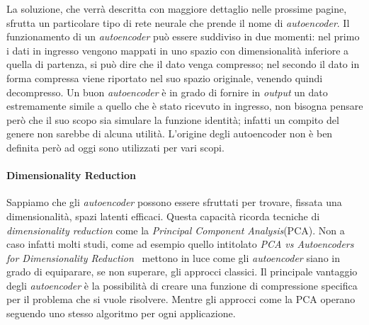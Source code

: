 %
%
%
%

La soluzione, che verrà descritta con maggiore dettaglio nelle prossime pagine, sfrutta un particolare tipo di rete neurale che prende il nome di \textit{autoencoder}.
Il funzionamento di un \textit{autoencoder} può essere suddiviso in due momenti:
nel primo i dati in ingresso vengono mappati in uno spazio con dimensionalità inferiore a quella di partenza, si può dire che il dato venga compresso;
nel secondo il dato in forma compressa viene riportato nel suo spazio originale, venendo quindi decompresso.
Un buon \textit{autoencoder} è in grado di fornire in \textit{output} un dato estremamente simile a quello che è stato ricevuto in ingresso, non bisogna pensare però che il suo scopo sia simulare la funzione identità; infatti un compito del genere non sarebbe di alcuna utilità.
L'origine degli autoencoder non è ben definita però ad oggi sono utilizzati per vari scopi.


\paragraph{Dimensionality Reduction}
Sappiamo che gli \textit{autoencoder} possono essere sfruttati per trovare, fissata una dimensionalità, spazi latenti efficaci.
Questa capacità ricorda tecniche di \textit{dimensionality reduction} come la \textit{Principal Component Analysis}(PCA).
Non a caso infatti molti studi, come ad esempio quello intitolato \textit{PCA vs Autoencoders for Dimensionality Reduction}~\cite{pca_vs_ae_1} mettono in luce come gli \textit{autoencoder} siano in grado di equiparare, se non superare, gli approcci classici.
Il principale vantaggio degli \textit{autoencoder} è la possibilità di creare una funzione di compressione specifica per il problema che si vuole risolvere.
Mentre gli approcci come la PCA operano seguendo uno stesso algoritmo per ogni applicazione.

